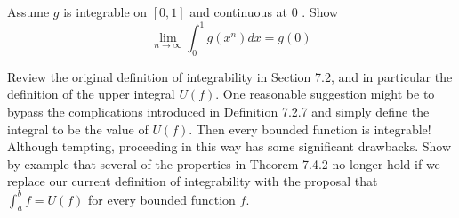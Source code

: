 \begin{exercise} Assume $g$ is integrable on $[0,1]$ and continuous at 0 . Show
$$
\lim _{n \rightarrow \infty} \int_{0}^{1} g\left(x^{n}\right) d x=g(0)
$$
\end{exercise}
\begin{solution}
    \TODO
\end{solution}

\begin{exercise}
Review the original definition of integrability in Section 7.2, and in particular the definition of the upper integral $U(f)$. One reasonable suggestion might be to bypass the complications introduced in Definition 7.2.7 and simply define the integral to be the value of $U(f)$. Then every bounded function is integrable! Although tempting, proceeding in this way has some significant drawbacks. Show by example that several of the properties in Theorem 7.4.2 no longer hold if we replace our current definition of integrability with the proposal that $\int_{a}^{b} f=U(f)$ for every bounded function $f$.
\end{exercise}
\begin{solution}
    \TODO
\end{solution}
